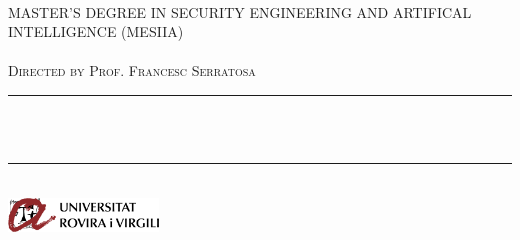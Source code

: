 \begin{titlepage}

  	\newcommand{\HRule}{\rule{\linewidth}{0.3mm}} %
	\center %
	

	{\large\sc\@author}\\[1.5cm] %

	\textsc{\LARGE MASTER’S DEGREE IN SECURITY ENGINEERING AND ARTIFICAL INTELLIGENCE (MESIIA)}\\[1.5cm]
	
	\textsc{\Large \deliverableName}\\[0.5cm]
	
	\textsc{\large Directed by Prof. Francesc Serratosa}\\[0.5cm]
	
	
	\HRule\\[0.4cm]
	
	{\huge\bfseries \@title}\\[0.4cm]
	
	\HRule\\[1.5cm]
	
	

    
	
	\vfill
	\includegraphics[width=0.3\textwidth]{./urvlogo.png}\\[2.0cm]
	

\end{titlepage}
